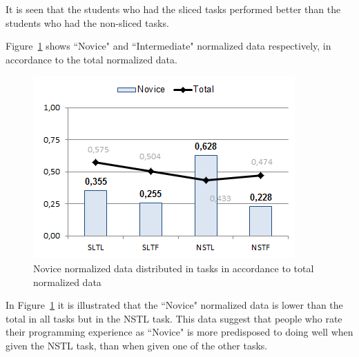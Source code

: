 \documentclass{sig-alternate-05-2015}
\begin{document}
It is seen that the students who had the sliced tasks performed better than the students who had the non-sliced tasks.

Figure~\ref{fig:Novice normalized data distributed in tasks in accordance to total normalized data} shows ``Novice" and ``Intermediate" normalized data respectively, in accordance to the total normalized data.

\begin{figure}[!ht]
	\centering
	\includegraphics[width=1\linewidth]{img11}
	\caption{Novice normalized data distributed in tasks in accordance to total normalized data}
	\label{fig:Novice normalized data distributed in tasks in accordance to total normalized data}
\end{figure}

In Figure~\ref{fig:Novice normalized data distributed in tasks in accordance to total normalized data} it is illustrated that the ``Novice" normalized data is lower than the total in all tasks but in the NSTL task. This data suggest that people who rate their programming experience as ``Novice" is more predisposed to doing well when given the NSTL task, than when given one of the other tasks.
\end{document}
